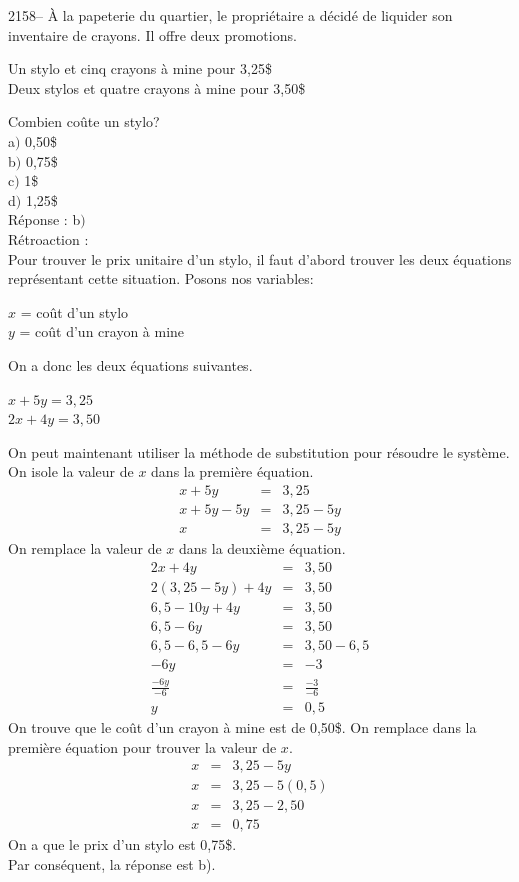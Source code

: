 \documentclass[letterpaper, 12pt]{article}
\begin{document}
2158-- \`A la papeterie du quartier, le propri\'etaire a d\'ecid\'e de liquider son inventaire de crayons. Il offre deux promotions.
\begin{center}
 Un stylo et cinq crayons \`a mine pour 3,25\$\\
Deux stylos et quatre crayons \`a mine pour 3,50\$
\end{center}
Combien co\^ute un stylo?\\

a$)$ 0,50\$\\
b$)$ 0,75\$\\
c$)$ 1\$\\
d$)$ 1,25\$\\

R\'eponse : b$)$\\

R\'etroaction :\\
Pour trouver le prix unitaire d'un stylo, il faut d'abord trouver les deux \'equations repr\'esentant cette situation. Posons nos variables:
\begin{center}
 $x$ = co\^ut d'un stylo\\
$y$ = co\^ut d'un crayon \`a mine
\end{center}
On a donc les deux \'equations suivantes.
\begin{center}
$x+5y=3,25$ \\
$2x+4y=3,50$
\end{center}
On peut maintenant utiliser la m\'ethode de substitution pour r\'esoudre le syst\`eme.\\
On isole la valeur de $x$ dans la premi\`ere \'equation.
\begin{eqnarray*}
x+5y&=&3,25\\
x+5y-5y&=&3,25-5y\\
x&=&3,25-5y
\end{eqnarray*}
On remplace la valeur de $x$ dans la deuxi\`eme \'equation.
\begin{eqnarray*}
2x+4y&=&3,50\\
2(3,25-5y)+4y&=&3,50\\
6,5-10y+4y&=&3,50\\
6,5-6y&=&3,50\\
6,5-6,5-6y&=&3,50-6,5\\
-6y&=&-3\\[2mm]
\frac{-6y}{-6}&=&\frac{-3}{-6}\\[2mm]
y&=&0,5
\end{eqnarray*}
On trouve que le co\^ut d'un crayon \`a mine est de 0,50\$. On remplace dans la premi\`ere \'equation pour trouver la valeur de $x$.
\begin{eqnarray*}
x&=&3,25-5y\\
x&=&3,25-5(0,5)\\
x&=&3,25-2,50\\
x&=&0,75
\end{eqnarray*}
On a que le prix d'un stylo est 0,75\$. \\
Par cons\'equent, la r\'eponse est b).\\
\end{document}
